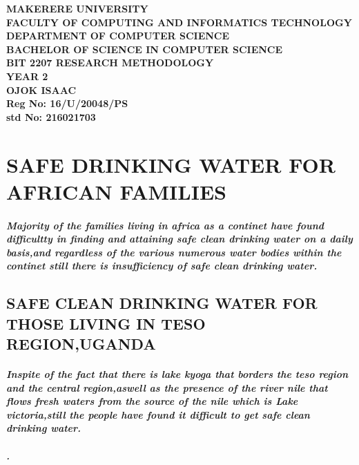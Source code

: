 \documentclass[a4paper,12pt]{article}
\begin{document}
\begin{Huge}
\begin{center}
\begin{normalsize}

\textbf{MAKERERE UNIVERSITY } \\
\textbf{FACULTY OF COMPUTING AND INFORMATICS TECHNOLOGY} \\
\textbf{DEPARTMENT OF COMPUTER SCIENCE} \\
\textbf{BACHELOR OF SCIENCE IN COMPUTER SCIENCE} \\
\textbf{BIT 2207 RESEARCH METHODOLOGY} \\
\textbf{YEAR 2} \\


\textbf{\sc OJOK ISAAC } \\
\textbf{\sc Reg No: 16/U/20048/PS } \\
\textbf{\sc std No: 216021703}\\
\end{normalsize}
\end{center}
\end{Huge}
\newpage

\section{\sc SAFE DRINKING WATER FOR AFRICAN FAMILIES}
\paragraph{\sl  Majority of the families living in africa as a continet have found difficultty in finding and attaining safe clean drinking water on a daily basis,and regardless of the various numerous water bodies within the continet still there is insufficiency of safe clean drinking water.}

\subsection{\sc SAFE CLEAN DRINKING WATER FOR THOSE LIVING IN TESO REGION,UGANDA}
\paragraph{ \sl Inspite of the fact that there is lake kyoga that borders the teso region and the central region,aswell as the presence of the river nile that flows fresh waters from the source of the nile which is Lake victoria,still the people have found it difficult to get safe clean drinking water.}
\paragraph{\sl  .}
\end{document}
